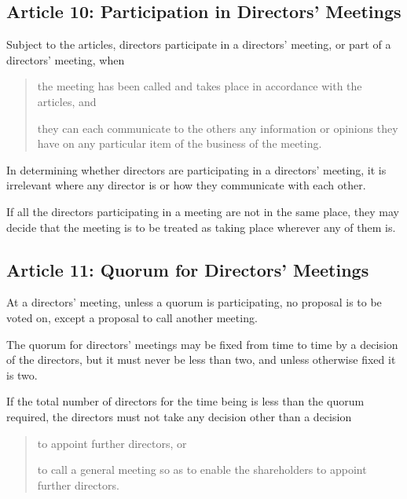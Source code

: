 \documentclass[letterpaper,10pt,openany,oneside,english]{sphinxmanual}
\begin{document}
\subsection{Article 10: Participation in Directors’ Meetings}
\label{\detokenize{directors:article-10-participation-in-directors-meetings}}\label{\detokenize{directors:article-10}}
 Subject to the articles, directors participate in a directors’ meeting, or part of a directors’ meeting, when
\begin{quote}

 the meeting has been called and takes place in accordance with the articles, and

 they can each communicate to the others any information or opinions they have on any particular item of the business of the meeting.
\end{quote}

 In determining whether directors are participating in a directors’ meeting, it is irrelevant where any director is or how they communicate with each other.

 If all the directors participating in a meeting are not in the same place, they may decide that the meeting is to be treated as taking place wherever any of them is.


\subsection{Article 11: Quorum for Directors’ Meetings}
\label{\detokenize{directors:article-11-quorum-for-directors-meetings}}\label{\detokenize{directors:article-11}}
 At a directors’ meeting, unless a quorum is participating, no proposal is to be voted on, except a proposal to call another meeting.

 The quorum for directors’ meetings may be fixed from time to time by a decision of the directors, but it must never be less than two, and unless otherwise fixed it is two.

 If the total number of directors for the time being is less than the quorum required, the directors must not take any decision other than a decision
\begin{quote}

 to appoint further directors, or

 to call a general meeting so as to enable the shareholders to appoint further directors.
\end{quote}
\end{document}
